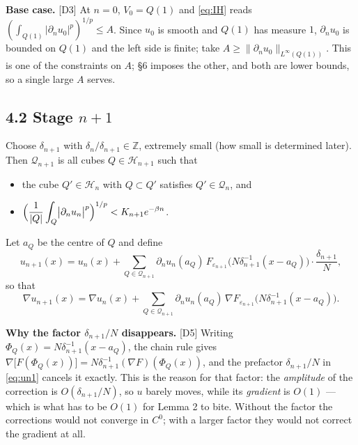 \documentclass[11pt,reqno]{amsart}
\theoremstyle{plain}
\theoremstyle{definition}
\theoremstyle{plain}
\theoremstyle{definition}
\theoremstyle{remark}
\newcommand{\nd}{\partial_n}
\newcommand{\Ledger}[1]{{\scriptsize\textsf{[#1]}}}
\begin{document}
\begin{expansion}
\textbf{Base case.} \Ledger{D3} At $n=0$, $V_0=Q(1)$ and \eqref{eq:IH} reads
$(\int_{Q(1)}|\nd u_0|^p)^{1/p}\le A$. Since $u_0$ is smooth and $Q(1)$ has measure
$1$, $\nd u_0$ is bounded on $Q(1)$ and the left side is finite; take
$A\ge\|\nd u_0\|_{L^\infty(Q(1))}$. This is one of the constraints on $A$; \S6
imposes the other, and both are lower bounds, so a single large $A$ serves.
\end{expansion}

\subsection*{4.2 Stage $n+1$}

Choose $\delta_{n+1}$ with $\delta_n/\delta_{n+1}\in\mathbb Z$, extremely small
(how small is determined later). Then $\mathcal Q_{n+1}$ is all cubes
$Q\in\mathcal H_{n+1}$ such that
\begin{itemize}[leftmargin=2.4em]
\item[(a)] the cube $Q'\in\mathcal H_n$ with $Q\subset Q'$ satisfies
  $Q'\in\mathcal Q_n$, and
\item[(b)] $\displaystyle\Bigl(\frac1{|Q|}\int_Q\bigl|\nd u_n\bigr|^p\Bigr)^{1/p}
  <K_{n+1}e^{-\beta n}$.
\end{itemize}
Let $a_Q$ be the centre of $Q$ and define
\begin{equation}\label{eq:un1}
 u_{n+1}(x)=u_n(x)+\sum_{Q\in\mathcal Q_{n+1}}\nd u_n(a_Q)\,
   F_{\varepsilon_{n+1}}\bigl(N\delta_{n+1}^{-1}(x-a_Q)\bigr)\cdot
   \frac{\delta_{n+1}}N,
\end{equation}
so that
\begin{equation}\label{eq:gradun1}
 \nabla u_{n+1}(x)=\nabla u_n(x)+\sum_{Q\in\mathcal Q_{n+1}}\nd u_n(a_Q)\,
   \nabla F_{\varepsilon_{n+1}}\bigl(N\delta_{n+1}^{-1}(x-a_Q)\bigr).
\end{equation}

\begin{expansion}
\textbf{Why the factor $\delta_{n+1}/N$ disappears.} \Ledger{D5} Writing
$\Phi_Q(x)=N\delta_{n+1}^{-1}(x-a_Q)$, the chain rule gives
$\nabla\bigl[F(\Phi_Q(x))\bigr]=N\delta_{n+1}^{-1}(\nabla F)(\Phi_Q(x))$, and the
prefactor $\delta_{n+1}/N$ in \eqref{eq:un1} cancels it exactly. This is the reason
for that factor: the \emph{amplitude} of the correction is $O(\delta_{n+1}/N)$, so
$u$ barely moves, while its \emph{gradient} is $O(1)$ --- which is what has to be
$O(1)$ for Lemma 2 to bite. Without the factor the corrections would not converge in
$C^0$; with a larger factor they would not correct the gradient at all.
\end{expansion}
\end{document}

